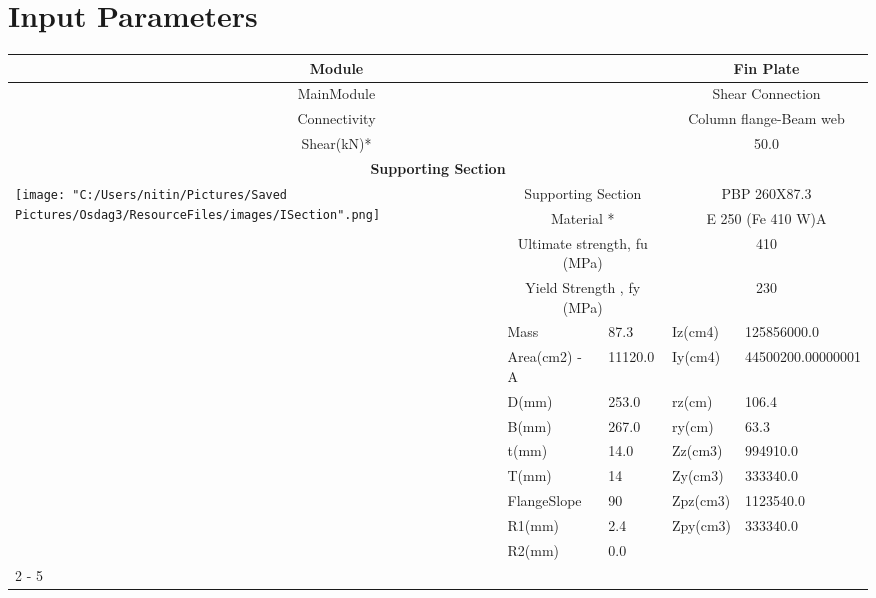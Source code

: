 \documentclass{article}%
\begin{document}
%
\normalsize%
\pagestyle{header}%
\section{Input Parameters}%
\label{sec:InputParameters}%
\renewcommand{\arraystretch}{1.2}%
\begin{longtable}{|p{5cm}|p{2cm}|p{2cm}|p{2cm}|p{5cm}|}%
\hline%
\hline%
\multicolumn{3}{|c|}{Module}&\multicolumn{2}{|c|}{Fin Plate}\\%
\hline%
\hline%
\multicolumn{3}{|c|}{MainModule}&\multicolumn{2}{|c|}{Shear Connection}\\%
\hline%
\hline%
\multicolumn{3}{|c|}{Connectivity}&\multicolumn{2}{|c|}{Column flange{-}Beam web}\\%
\hline%
\hline%
\multicolumn{3}{|c|}{Shear(kN)*}&\multicolumn{2}{|c|}{50.0}\\%
\hline%
\hline%
\multicolumn{5}{|c|}{\textbf{Supporting Section}}\\%
\hline%
\hline%
\multirow{13}{*}{\texttt{[image: "C:/Users/nitin/Pictures/Saved Pictures/Osdag3/ResourceFiles/images/ISection".png]}}&\multicolumn{2}{|c|}{Supporting Section}&\multicolumn{2}{|c|}{PBP 260X87.3}\\%
\cline{2%
-%
5}%
&\multicolumn{2}{|c|}{Material *}&\multicolumn{2}{|c|}{E 250 (Fe 410 W)A}\\%
\cline{2%
-%
5}%
&\multicolumn{2}{|c|}{Ultimate strength, fu (MPa)}&\multicolumn{2}{|c|}{410}\\%
\cline{2%
-%
5}%
&\multicolumn{2}{|c|}{Yield Strength , fy (MPa)}&\multicolumn{2}{|c|}{230}\\%
\cline{2%
-%
5}%
&Mass&87.3&Iz(cm4)&125856000.0\\%
\cline{2%
-%
5}%
&Area(cm2) {-} A&11120.0&Iy(cm4)&44500200.00000001\\%
\cline{2%
-%
5}%
&D(mm)&253.0&rz(cm)&106.4\\%
\cline{2%
-%
5}%
&B(mm)&267.0&ry(cm)&63.3\\%
\cline{2%
-%
5}%
&t(mm)&14.0&Zz(cm3)&994910.0\\%
\cline{2%
-%
5}%
&T(mm)&14&Zy(cm3)&333340.0\\%
\cline{2%
-%
5}%
&FlangeSlope&90&Zpz(cm3)&1123540.0\\%
\cline{2%
-%
5}%
&R1(mm)&2.4&Zpy(cm3)&333340.0\\%
\cline{2%
-%
5}%
&R2(mm)&0.0&&\\%
\cline{2%
-%
5}%
\hline%
\multicolumn{5}{|c|}{\textbf{Supported Section}}\\%

\end{longtable}
\end{document}

